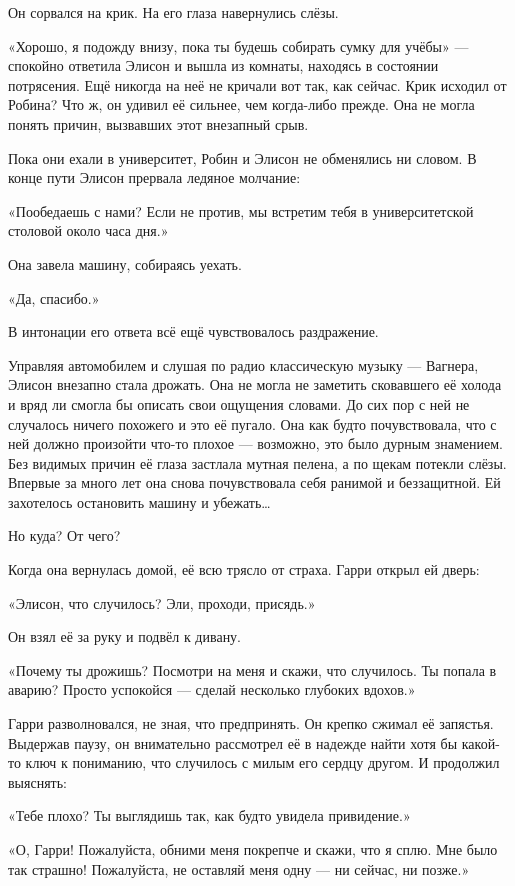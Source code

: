 \documentclass[a5paper, 9pt,
final, openany, twoside=true]{memoir}
\begin{document}
Он сорвался на крик. На его глаза навернулись слёзы.\bigskip

«Хорошо, я подожду внизу, пока ты будешь собирать сумку для учёбы» — спокойно ответила Элисон и вышла из комнаты, находясь в состоянии потрясения. Ещё никогда на неё не кричали вот так, как сейчас. Крик исходил от Робина? Что ж, он удивил её сильнее, чем когда-либо прежде. Она не могла понять причин, вызвавших этот внезапный срыв.\bigskip

Пока они ехали в университет, Робин и Элисон не обменялись ни словом. В конце пути Элисон прервала ледяное молчание:

«Пообедаешь с нами? Если не против, мы встретим тебя в университетской столовой около часа дня.»

Она завела машину, собираясь уехать.

«Да, спасибо.»

В интонации его ответа всё ещё чувствовалось раздражение.\bigskip

Управляя автомобилем и слушая по радио классическую музыку — Вагнера, Элисон внезапно стала дрожать. Она не могла не заметить сковавшего её холода и вряд ли смогла бы описать свои ощущения словами. До сих пор с ней не случалось ничего похожего и это её пугало. Она как будто почувствовала, что с ней должно произойти что-то плохое — возможно, это было дурным знамением. Без видимых причин её глаза застлала мутная пелена, а по щекам потекли слёзы. Впервые за много лет она снова почувствовала себя ранимой и беззащитной. Ей захотелось остановить машину и убежать…

Но куда? От чего?\bigskip

Когда она вернулась домой, её всю трясло от страха. Гарри открыл ей дверь:

«Элисон, что случилось? Эли, проходи, присядь.»

Он взял её за руку и подвёл к дивану.

«Почему ты дрожишь? Посмотри на меня и скажи, что случилось. Ты попала в аварию? Просто успокойся — сделай несколько глубоких вдохов.»

Гарри разволновался, не зная, что предпринять. Он крепко сжимал её запястья. Выдержав паузу, он внимательно рассмотрел её в надежде найти хотя бы какой-то ключ к пониманию, что случилось с милым его сердцу другом. И продолжил выяснять:

«Тебе плохо? Ты выглядишь так, как будто увидела привидение.»

«О, Гарри! Пожалуйста, обними меня покрепче и скажи, что я сплю. Мне было так страшно! Пожалуйста, не оставляй меня одну — ни сейчас, ни позже.»
\end{document}
